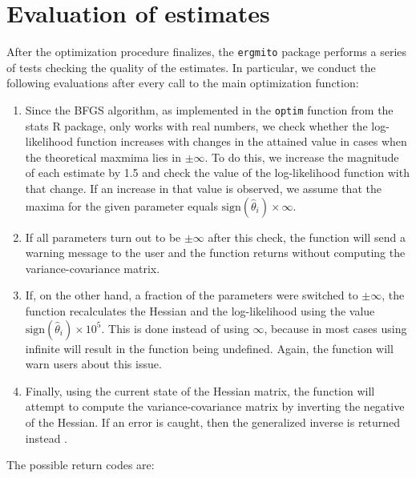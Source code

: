 \documentclass[review]{elsarticle}
\begin{document}
\section{\label{sec:evaluation-of-estimates}Evaluation of estimates}

After the optimization procedure finalizes, the \texttt{ergmito} package performs a series of tests checking the quality of the estimates. In particular, we conduct the following evaluations after every call to the main optimization function:

\begin{enumerate}
	\item Since the BFGS algorithm, as implemented in the \texttt{optim} function from the stats R package, only works with real numbers, we check whether the log-likelihood function increases with changes in the attained value in cases when the theoretical maxmima lies in $\pm\infty$. To do this, we increase the magnitude of each estimate by 1.5 and check the value of the log-likelihood function with that change. If an increase in that value is observed, we assume that the maxima for the given parameter equals $\mbox{sign}(\hat\theta_i)\times\infty$.
	
	\item If all parameters turn out to be $\pm\infty$ after this check, the function will send a warning message to the user and the function returns without computing the variance-covariance matrix.
	
	\item If, on the other hand, a fraction of the parameters were switched to $\pm\infty$, the function recalculates the Hessian and the log-likelihood using the value $\mbox{sign}(\hat \theta_i)\times 10^{5}$. This is done instead of using $\infty$, because in most cases using infinite will result in the function being undefined. Again, the function will warn users about this issue.
	
	\item Finally, using the current state of the Hessian matrix, the function will attempt to compute the variance-covariance matrix by inverting the negative of the Hessian. If an error is caught, then the generalized inverse is returned instead \cite{Gill2004}.
\end{enumerate}

The possible return codes are:
\end{document}
